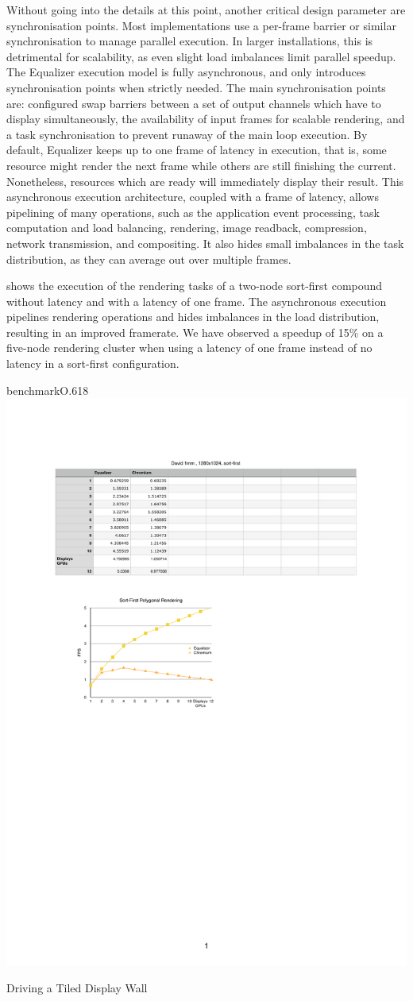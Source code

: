 Without going into the details at this point, another critical design parameter
are synchronisation points. Most implementations use a per-frame barrier or
similar synchronisation to manage parallel execution. In larger installations,
this is detrimental for scalability, as even slight load imbalances limit
parallel speedup. The Equalizer execution model is fully asynchronous, and
only introduces synchronisation points when strictly needed. The main
synchronisation points are: configured swap barriers between a set of output
channels which have to display simultaneously, the availability of input frames
for scalable rendering, and a task synchronisation to prevent runaway of the
main loop execution. By default, Equalizer keeps up to one frame of latency in
execution, that is, some resource might render the next frame while others are
still finishing the current. Nonetheless, resources which are ready will
immediately display their result. This asynchronous execution architecture,
coupled with a frame of latency, allows pipelining of many operations, such as
the application event processing, task computation and load balancing,
rendering, image readback, compression, network transmission, and compositing.
It also hides small imbalances in the task distribution, as they can average
out over multiple frames.

 shows the execution of the rendering tasks of a two-node
sort-first compound without latency and with a latency of one frame. The
asynchronous execution pipelines rendering operations and hides imbalances in
the load distribution, resulting in an improved framerate. We have observed a
speedup of 15\% on a five-node rendering cluster when using a latency of one
frame instead of no latency in a sort-first configuration.

\begin{wrapfloat}{benchmark}{O}{.618\textwidth}
 \includegraphics[width=.618\textwidth]{results/cr}
 {\caption{\label{rCR}Driving a Tiled Display Wall}}
\end{wrapfloat}

